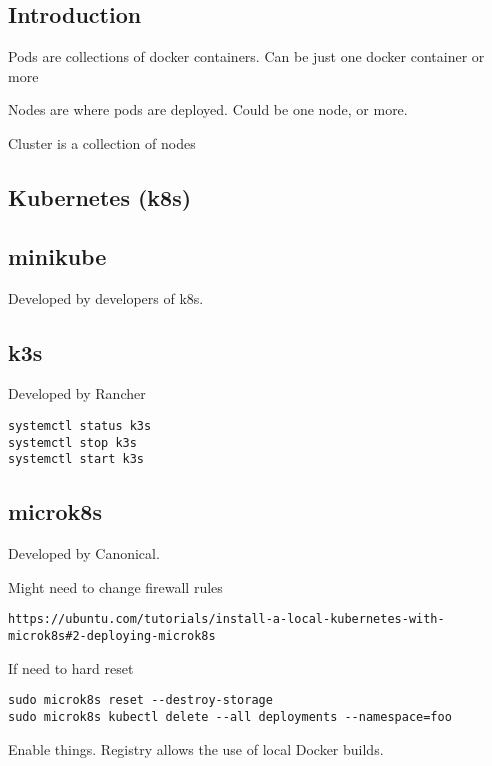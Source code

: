 
\subsection{Introduction}





Pods are collections of docker containers. Can be just one docker container or more

Nodes are where pods are deployed. Could be one node, or more.

Cluster is a collection of nodes

\subsection{Kubernetes (k8s)}


\subsection{minikube}
Developed by developers of k8s.

\subsection{k3s}

Developed by Rancher

\begin{verbatim}
systemctl status k3s
systemctl stop k3s
systemctl start k3s
\end{verbatim}


\subsection{microk8s}

Developed by Canonical.

Might need to change firewall rules

\begin{verbatim}
https://ubuntu.com/tutorials/install-a-local-kubernetes-with-microk8s#2-deploying-microk8s
\end{verbatim}
If need to hard reset

\begin{verbatim}
sudo microk8s reset --destroy-storage
sudo microk8s kubectl delete --all deployments --namespace=foo
\end{verbatim}



Enable things.
Registry allows the use of local Docker builds.

